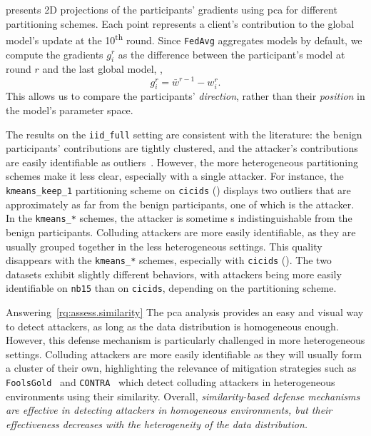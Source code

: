  presents 2D projections of the participants' gradients using \gls{pca} for different partitioning schemes.
Each point represents a client's contribution to the global model's update at the 10\textsuperscript{th} round.
Since \texttt{FedAvg} aggregates models by default, we compute the gradients $g_i^r$ as the difference between the participant's model at round $r$ and the last global model, \ie,
\begin{equation}
  g_i^r = \bar{w}^{r-1} - w_i^r.
\end{equation}
This allows us to compare the participants' \emph{direction}, rather than their \emph{position} in the model's parameter space.

The results on the \verb|iid_full| setting are consistent with the literature: the benign participants' contributions are tightly clustered, and the attacker's contributions are easily identifiable as outliers~\cite{tolpegin_DataPoisoningAttacks_2020}.
However, the more heterogeneous partitioning schemes make it less clear, especially with a single attacker.
For instance, the \verb|kmeans_keep_1| partitioning scheme on \texttt{cicids} () displays two outliers that are approximately as far from the benign participants, one of which is the attacker.
In the \verb|kmeans_*| schemes, the attacker is sometime s indistinguishable from the benign participants.
Colluding attackers are more easily identifiable, as they are usually grouped together in the less heterogeneous settings.
This quality disappears with the \verb|kmeans_*| schemes, especially with \texttt{cicids} ().
The two datasets exhibit slightly different behaviors, with attackers being more easily identifiable on \texttt{nb15} than on \texttt{cicids}, depending on the partitioning scheme.

\begin{answerbox}{Answering~\ref{rq:assess.similarity} \normalfont\itshape\rqsim}
  The \gls{pca} analysis provides an easy and visual way to detect attackers, as long as the data distribution is homogeneous enough.
  However, this defense mechanism is particularly challenged in more heterogeneous settings.
  Colluding attackers are more easily identifiable as they will usually form a cluster of their own, highlighting the relevance of mitigation strategies such as \texttt{FoolsGold}~\cite{fung_LimitationsFederatedLearning_2020} and \texttt{CONTRA}~\cite{awan_CONTRADefendingPoisoning_2021} which detect colluding attackers in heterogeneous environments using their similarity.
  Overall, \emph{similarity-based defense mechanisms are effective in detecting attackers in homogeneous environments, but their effectiveness decreases with the heterogeneity of the data distribution.}
\end{answerbox}
